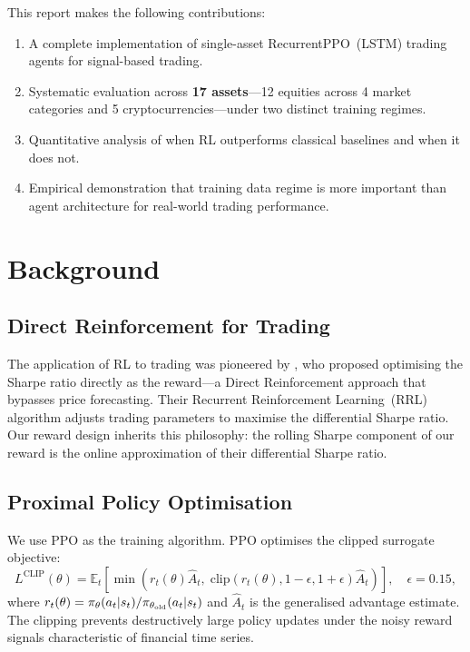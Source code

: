 \documentclass[12pt,a4paper]{article}
\begin{document}
This report makes the following contributions:
\begin{enumerate}[nosep]
  \item A complete implementation of single-asset RecurrentPPO~(LSTM)
        trading agents for signal-based trading.
  \item Systematic evaluation across \textbf{17 assets}---12 equities
        across 4 market categories and 5 cryptocurrencies---under two
        distinct training regimes.
  \item Quantitative analysis of when RL outperforms classical
        baselines and when it does not.
  \item Empirical demonstration that training data regime is more important
        than agent architecture for real-world trading performance.
\end{enumerate}

\section{Background}

\subsection{Direct Reinforcement for Trading}

The application of RL to trading was pioneered by \citet{moody2001}, who
proposed optimising the Sharpe ratio directly as the reward---a Direct
Reinforcement approach that bypasses price forecasting. Their Recurrent
Reinforcement Learning~(RRL) algorithm adjusts trading parameters to
maximise the differential Sharpe ratio. Our reward design inherits this
philosophy: the rolling Sharpe component of our reward is the online
approximation of their differential Sharpe ratio.

\subsection{Proximal Policy Optimisation}

We use PPO \citep{schulman2017} as the training algorithm. PPO optimises
the clipped surrogate objective:
\begin{equation}
  L^{\text{CLIP}}(\theta) = \mathbb{E}_t\!\left[
    \min\!\left(r_t(\theta)\hat{A}_t,\;
      \mathrm{clip}(r_t(\theta),1{-}\epsilon,1{+}\epsilon)\hat{A}_t
    \right)
  \right],\quad \epsilon=0.15,
\end{equation}
where $r_t(\theta)=\pi_\theta(a_t|s_t)/\pi_{\theta_{\rm old}}(a_t|s_t)$ and
$\hat{A}_t$ is the generalised advantage estimate. The clipping prevents
destructively large policy updates under the noisy reward signals
characteristic of financial time series.
\end{document}
